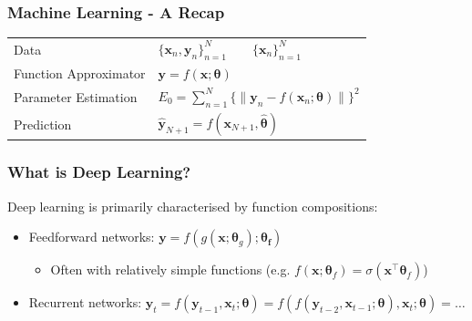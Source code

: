 \documentclass[]{article}
\begin{document}
\begin{frame}
\frametitle{Machine Learning - A Recap}
\vspace{5mm}
\begin{tabular}{ll}
Data & $\{\bm{x}_n, \bm{y}_n\}^N_{n=1} \qquad \{\bm{x}_n\}^N_{n=1}$
\vspace{3mm} \\ \pause
Function Approximator & $\bm{y} = f (\bm{x}; \bm{\theta})$ %
\vspace{3mm} \\ \pause
Parameter Estimation & $E_0 = \sum^N_{n=1} \{\|\bm{y}_n - f (\bm{x}_n; \bm{\theta})\|\}^2$
\vspace{3mm} \\ \pause
Prediction & $\bm{\hat y}_{N+1} = f(\bm{x}_{N+1}, \bm{\hat \theta})$
\end{tabular}
\vspace{5mm}
\end{frame}

\begin{frame}
\frametitle{What is Deep Learning?}

Deep learning is primarily characterised by function compositions: \\ \vspace{10mm}
\begin{itemize}
	\item<2-> Feedforward networks: $\bm{y} = f (g(\bm{x}; \bm\theta_g); \bm{\theta_f})$
	\begin{itemize}
		\item Often with relatively simple functions (e.g. $f(\bm x; \bm{\theta}_f) = \sigma(\bm{x}^\top \bm{\theta}_f)$)
	\end{itemize} \vspace{3mm}
	\item<3-> Recurrent networks: $\bm y_t = f(\bm y_{t-1}, \bm x_t; \bm\theta) = f(f(\bm y_{t-2}, \bm x_{t-1}; \bm\theta), \bm x_t; \bm\theta) = \dots$
\end{itemize}
\vspace{10mm}

\end{frame}
\end{document}
